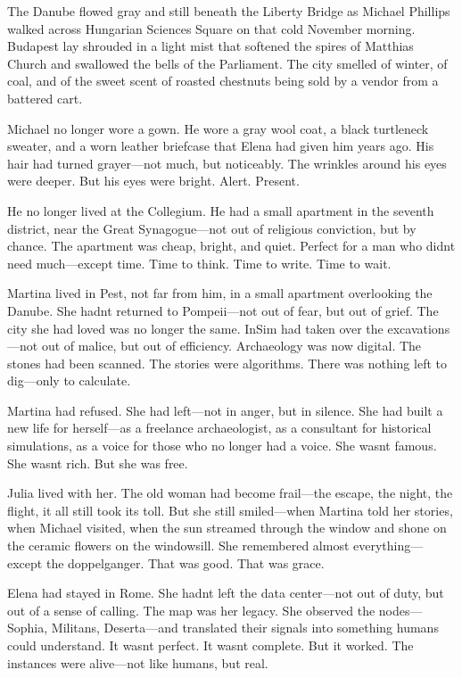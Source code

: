 \documentclass[
]{article}
\begin{document}
The Danube flowed gray and still beneath the Liberty Bridge as Michael Phillips walked across Hungarian Sciences Square on that cold November morning. Budapest lay shrouded in a light mist that softened the spires of Matthias Church and swallowed the bells of the Parliament. The city smelled of winter, of coal, and of the sweet scent of roasted chestnuts being sold by a vendor from a battered cart.

Michael no longer wore a gown. He wore a gray wool coat, a black turtleneck sweater, and a worn leather briefcase that Elena had given him years ago. His hair had turned grayer---not much, but noticeably. The wrinkles around his eyes were deeper. But his eyes were bright. Alert. Present.

He no longer lived at the Collegium. He had a small apartment in the seventh district, near the Great Synagogue---not out of religious conviction, but by chance. The apartment was cheap, bright, and quiet. Perfect for a man who didn\textquotesingle t need much---except time. Time to think. Time to write. Time to wait.

Martina lived in Pest, not far from him, in a small apartment overlooking the Danube. She hadn\textquotesingle t returned to Pompeii---not out of fear, but out of grief. The city she had loved was no longer the same. InSim had taken over the excavations---not out of malice, but out of efficiency. Archaeology was now digital. The stones had been scanned. The stories were algorithms. There was nothing left to dig---only to calculate.

Martina had refused. She had left---not in anger, but in silence. She had built a new life for herself---as a freelance archaeologist, as a consultant for historical simulations, as a voice for those who no longer had a voice. She wasn\textquotesingle t famous. She wasn\textquotesingle t rich. But she was free.

Julia lived with her. The old woman had become frail---the escape, the night, the flight, it all still took its toll. But she still smiled---when Martina told her stories, when Michael visited, when the sun streamed through the window and shone on the ceramic flowers on the windowsill. She remembered almost everything---except the doppelganger. That was good. That was grace.

Elena had stayed in Rome. She hadn\textquotesingle t left the data center---not out of duty, but out of a sense of calling. The map was her legacy. She observed the nodes---Sophia, Militans, Deserta---and translated their signals into something humans could understand. It wasn\textquotesingle t perfect. It wasn\textquotesingle t complete. But it worked. The instances were alive---not like humans, but real.
\end{document}
